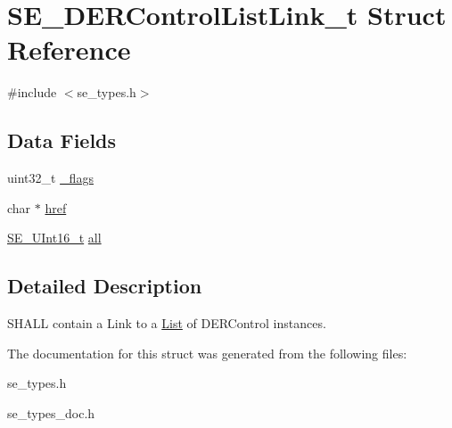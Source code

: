 \hypertarget{structSE__DERControlListLink__t}{}\section{S\+E\+\_\+\+D\+E\+R\+Control\+List\+Link\+\_\+t Struct Reference}
\label{structSE__DERControlListLink__t}


{\ttfamily \#include $<$se\+\_\+types.\+h$>$}

\subsection*{Data Fields}
\begin{DoxyCompactItemize}
\item 
uint32\+\_\+t \hyperlink{group__DERControlListLink_ga1252d821e67ab41c8caafaaf8f3e83be}{\+\_\+flags}
\item 
char $\ast$ \hyperlink{group__DERControlListLink_gafecc636897f0be0e049531c10b59621d}{href}
\item 
\hyperlink{group__UInt16_gac68d541f189538bfd30cfaa712d20d29}{S\+E\+\_\+\+U\+Int16\+\_\+t} \hyperlink{group__DERControlListLink_ga3fbaa85b2e1da1b034164f21a22a1503}{all}
\end{DoxyCompactItemize}


\subsection{Detailed Description}
S\+H\+A\+LL contain a Link to a \hyperlink{structList}{List} of D\+E\+R\+Control instances. 

The documentation for this struct was generated from the following files\+:\begin{DoxyCompactItemize}
\item 
se\+\_\+types.\+h\item 
se\+\_\+types\+\_\+doc.\+h\end{DoxyCompactItemize}

